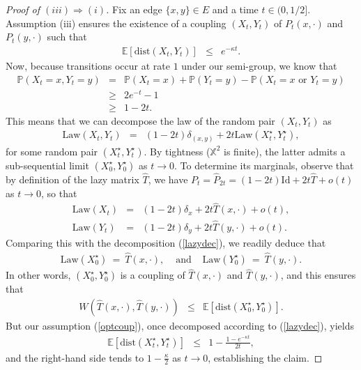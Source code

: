 \documentclass[12pt,final]{article}
\numberwithin{equation}{section}
\newcommand{\EE}{{\mathbb{E}}}
\newcommand{\PP}{{\mathbb{P}}}
\newcommand{\dX}{\mathbb{X}}
\newcommand{\dist}{\mathrm{dist}}
\begin{document}
\begin{proof}[Proof of $(iii)\Longrightarrow(i)$]Fix an edge $\{x,y\}\in E$ and a time $t\in (0,1/2]$. Assumption (iii) ensures the existence of a coupling $(X_t,Y_t)$ of $P_t(x,\cdot)$ and $P_t(y,\cdot)$ such that
\begin{eqnarray}
\label{optcoup}
\EE[\dist(X_t,Y_t)] & \le & e^{-\kappa t}. 
\end{eqnarray}
Now, because transitions occur at rate $1$ under our semi-group, we know that
\begin{eqnarray*}
\PP(X_t=x,Y_t=y) & = & \PP(X_t=x)+\PP(Y_t=y)-\PP(X_t=x\textrm{ or }Y_t=y)\\
& \ge & 2e^{-t}-1\\
& \ge & 1-2t.
\end{eqnarray*}
This means that we can decompose the law of the random pair $(X_t,Y_t)$ as
\begin{eqnarray}
\label{lazydec}
\mathrm{Law}(X_t,Y_t) & = & (1-2t)\delta_{(x,y)}+2t\mathrm{Law}(X_t^\star,Y_t^\star),
\end{eqnarray}
for some random pair $(X^\star_t,Y^\star_t)$. By tightness ($\dX^2$ is finite), the latter admits a sub-sequential limit $(X_0^\star,Y_0^\star)$ as $t\to 0$. To determine its marginals, observe that by definition of the lazy matrix $\widehat{T}$, we have $P_t=\widehat{P}_{2t}=(1-2t)\mathrm{Id}+2t\widehat{T}+o(t)$ as $t\to 0$, so that
\begin{eqnarray*}
\mathrm{Law}(X_t) & = & (1-2t)\delta_{x}+2t\widehat{T}(x,\cdot)+o(t),\\
\mathrm{Law}(Y_t) & = & (1-2t)\delta_{y}+2t\widehat{T}(y,\cdot)+o(t).
\end{eqnarray*}
Comparing this with the decomposition (\ref{lazydec}), we readily deduce that 
\begin{eqnarray*}
\mathrm{Law}(X_0^\star) \ = \ \widehat{T}(x,\cdot), & \textrm{ and } & 
\mathrm{Law}(Y_0^\star) \ = \ \widehat{T}(y,\cdot).
\end{eqnarray*}
In other words, $(X_0^\star,Y_0^\star)$ is a coupling of $\widehat{T}(x,\cdot)$ and $\widehat{T}(y,\cdot)$, and this ensures that 
\begin{eqnarray*}
W\left(\widehat{T}(x,\cdot),\widehat{T}(y,\cdot)\right) & \le & \EE[\dist(X_0^\star,Y_0^\star)].
\end{eqnarray*}
But our assumption (\ref{optcoup}), once decomposed according to (\ref{lazydec}), yields
\begin{eqnarray*}
\EE\left[\dist\left({X}_t^\star,{Y}_t^\star\right)\right]  & \le &  1-\frac{1-e^{-\kappa t}}{2t},
\end{eqnarray*}
and the right-hand side tends to $1-\frac{\kappa}{2}$ as $t\to 0$, establishing the claim.
\end{proof}
\end{document}
